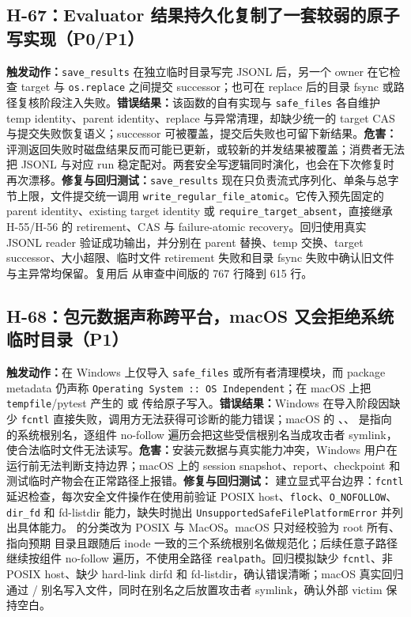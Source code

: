\documentclass[11pt,a4paper,fontset=fandol]{ctexart}
\newcommand{\code}[1]{\texttt{#1}}
\begin{document}
\subsection{H-67：Evaluator 结果持久化复制了一套较弱的原子写实现（P0/P1）}

\textbf{触发动作：}\code{save\_results} 在独立临时目录写完 JSONL 后，另一个 owner 在它检查 target 与 \code{os.replace} 之间提交 successor；也可在 replace 后的目录 fsync 或路径复核阶段注入失败。\textbf{错误结果：}该函数的自有实现与 \code{safe\_files} 各自维护 temp identity、parent identity、replace 与异常清理，却缺少统一的 target CAS 与提交失败恢复语义；successor 可被覆盖，提交后失败也可留下新结果。\textbf{危害：}评测返回失败时磁盘结果反而可能已更新，或较新的并发结果被覆盖；消费者无法把 JSONL 与对应 run 稳定配对。两套安全写逻辑同时演化，也会在下次修复时再次漂移。\textbf{修复与回归测试：}\code{save\_results} 现在只负责流式序列化、单条与总字节上限，文件提交统一调用 \code{write\_regular\_file\_atomic}。它传入预先固定的 parent identity、existing target identity 或 \code{require\_target\_absent}，直接继承 H-55/H-56 的 retirement、CAS 与 failure-atomic recovery。回归使用真实 JSONL reader 验证成功输出，并分别在 parent 替换、temp 交换、target successor、大小超限、临时文件 retirement 失败和目录 fsync 失败中确认旧文件与主异常均保留。复用后  从审查中间版的 767 行降到 615 行。

\subsection{H-68：包元数据声称跨平台，macOS 又会拒绝系统临时目录（P1）}

\textbf{触发动作：}在 Windows 上仅导入 \code{safe\_files} 或所有者清理模块，而 package metadata 仍声称 \code{Operating System :: OS Independent}；在 macOS 上把 \code{tempfile}/pytest 产生的  或  传给原子写入。\textbf{错误结果：}Windows 在导入阶段因缺少 \code{fcntl} 直接失败，调用方无法获得可诊断的能力错误；macOS 的 、、 是指向  的系统根别名，逐组件 no-follow 遍历会把这些受信根别名当成攻击者 symlink，使合法临时文件无法读写。\textbf{危害：}安装元数据与真实能力冲突，Windows 用户在运行前无法判断支持边界；macOS 上的 session snapshot、report、checkpoint 和测试临时产物会在正常路径上报错。\textbf{修复与回归测试：} 建立显式平台边界：\code{fcntl} 延迟检查，每次安全文件操作在使用前验证 POSIX host、\code{flock}、\code{O\_NOFOLLOW}、\code{dir\_fd} 和 fd-listdir 能力，缺失时抛出 \code{UnsupportedSafeFilePlatformError} 并列出具体能力。 的分类改为 POSIX 与 MacOS。macOS 只对经校验为 root 所有、指向预期  目录且跟随后 inode 一致的三个系统根别名做规范化；后续任意子路径继续按组件 no-follow 遍历，不使用全路径 \code{realpath}。回归模拟缺少 \code{fcntl}、非 POSIX host、缺少 hard-link dirfd 和 fd-listdir，确认错误清晰；macOS 真实回归通过 / 别名写入文件，同时在别名之后放置攻击者 symlink，确认外部 victim 保持空白。
\end{document}
